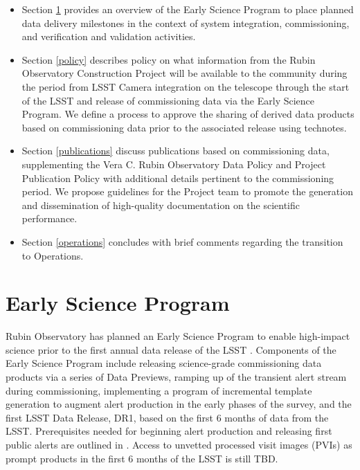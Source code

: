 \documentclass[SE,authoryear,toc]{lsstdoc}
\begin{document}
\begin{itemize}

  \item Section \ref{early_science} provides an overview of the Early Science Program to place planned data delivery milestones in the context of system integration, commissioning, and verification and validation activities.

  \item Section \ref{policy} describes policy on what information from the Rubin Observatory Construction Project will be available to the community during the period from LSST Camera integration on the telescope through the start of the LSST and release of commissioning data via the Early Science Program.
  We define a process to approve the sharing of derived data products based on commissioning data prior to the associated release using technotes.

  \item Section \ref{publications} discuss publications based on commissioning data, supplementing the Vera C. Rubin Observatory Data Policy  and Project Publication Policy \citep{LPM-162} with additional details pertinent to the commissioning period.
  We propose guidelines for the Project team to promote the generation and dissemination of high-quality documentation on the scientific performance.

  \item Section \ref{operations} concludes with brief comments regarding the transition to Operations.

\end{itemize}

\section{Early Science Program}
\label{early_science}

Rubin Observatory has planned an Early Science Program to enable high-impact science prior to the first annual data release of the LSST .
Components of the Early Science Program include releasing science-grade commissioning data products via a series of Data Previews, ramping up of the transient alert stream during commissioning, implementing a program of incremental template generation to augment alert production in the early phases of the survey, and the first LSST Data Release, DR1, based on the first 6 months of data from the LSST.
Prerequisites needed for beginning alert production and releasing first public alerts are outlined in .
Access to unvetted processed visit images (PVIs) as prompt products in the first 6 months of the LSST is still TBD.
\end{document}
